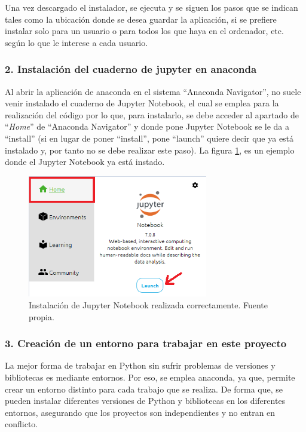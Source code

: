     Una vez descargado el instalador, se ejecuta y se siguen los pasos que se indican tales como la ubicación donde se desea guardar la aplicación, si se prefiere instalar solo para un usuario o para todos los que haya en el ordenador, etc. según lo que le interese a cada usuario. 
    
\subsubsection{2. Instalación del cuaderno de jupyter en anaconda}
    
    Al abrir la aplicación de anaconda en el sistema ``Anaconda Navigator'', no suele venir instalado el cuaderno de Jupyter Notebook, el cual se emplea para la realización del código por lo que, para instalarlo, se debe acceder al apartado de ``\textit{Home}'' de ``Anaconda Navigator'' y donde pone Jupyter Notebook se le da a ``install'' (si en lugar de poner ``install'', pone ``launch'' quiere decir que ya está instalado y, por tanto no se debe realizar este paso). La figura \ref{fig:instalacion_jupyterNotebook}, es un ejemplo donde el Jupyter Notebook ya está instado.

    \begin{figure}[ht]
        \centering
        \includegraphics[width=0.70\textwidth]{img/instalacion_jupyterNotebook.PNG}
        \caption{Instalación de Jupyter Notebook realizada correctamente. Fuente propia.}
        \label{fig:instalacion_jupyterNotebook}
    \end{figure}
    \FloatBarrier

\subsubsection{3. Creación de un entorno para trabajar en este proyecto}
    
    La mejor forma de trabajar en Python sin sufrir problemas de versiones y bibliotecas es mediante entornos. Por eso, se emplea anaconda, ya que, permite crear un entorno distinto para cada trabajo que se realiza. De forma que, se pueden instalar diferentes versiones de Python y bibliotecas en los diferentes entornos, asegurando que los proyectos son independientes y no entran en conflicto. 

